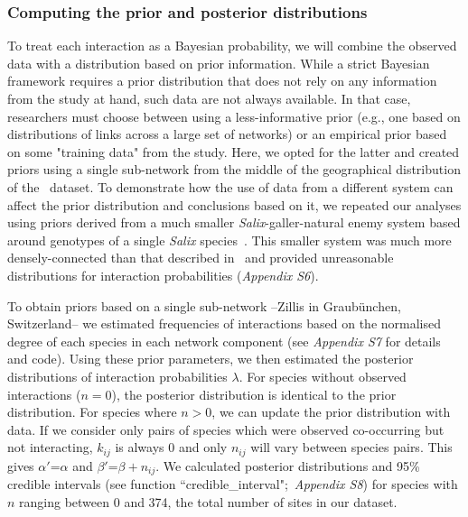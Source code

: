 \documentclass[12pt]{article}
\begin{document}
\begin{spacing}{2.0}
    \subsubsection*{Computing the prior and posterior distributions}

        To treat each interaction as a Bayesian probability, we will combine the observed data with a distribution based on prior information. While a strict Bayesian framework requires a prior distribution that does not rely on any information from the study at hand, such data are not always available. In that case, researchers must choose between using a less-informative prior (e.g., one based on distributions of links across a large set of networks) or an empirical prior based on some "training data" from the study. Here, we opted for the latter and created priors using a single sub-network from the middle of the geographical distribution of the~\citet{Kopelke2017} dataset. To demonstrate how the use of data from a different system can affect the prior distribution and conclusions based on it, we repeated our analyses using priors derived from a much smaller \emph{Salix}-galler-natural enemy system based around genotypes of a single \emph{Salix} species~\citep[Data available from the Dryad Digital Repository: https://doi.org/10.5061/dryad.g7805]{Barbour2016}\nocite{Barbour2016Dryad}. This smaller system was much more densely-connected than that described in~\citet{Kopelke2017} and provided unreasonable distributions for interaction probabilities (\emph{Appendix S6}). 


        To obtain priors based on a single sub-network --Zillis in Graub\"{u}nchen, Switzerland-- we estimated frequencies of interactions based on the normalised degree of each species in each network component (see \emph{Appendix S7} for details and code). Using these prior parameters, we then estimated the posterior distributions of interaction probabilities $\lambda$. For species without observed interactions ($n = 0$), the posterior distribution is identical to the prior distribution. For species where $n>0$, we can update the prior distribution with data. If we consider only pairs of species which were observed co-occurring but not interacting, $k_{ij}$ is always 0 and only $n_{ij}$ will vary between species pairs. This gives $\alpha'$=$\alpha$ and $\beta'$=$\beta + n_{ij}$. We calculated posterior distributions and 95\% credible intervals (see function ``credible\_interval";~\emph{Appendix S8}) for species with $n$ ranging between 0 and 374, the total number of sites in our dataset. 



\end{spacing}
\end{document}
